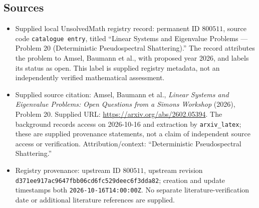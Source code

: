 \documentclass[11pt]{article}
\begin{document}
\subsection{Sources}
\begin{itemize}
\item Supplied local UnsolvedMath registry record: permanent ID \(800511\), source code \texttt{catalogue entry}, titled ``Linear Systems and Eigenvalue Problems --- Problem 20 (Deterministic Pseudospectral Shattering).'' The record attributes the problem to Amsel, Baumann et al., with proposed year 2026, and labels its status as open. This label is supplied registry metadata, not an independently verified mathematical assessment.
\item Supplied source citation: Amsel, Baumann et al., \emph{Linear Systems and Eigenvalue Problems: Open Questions from a Simons Workshop} (2026), Problem 20. Supplied URL: \url{https://arxiv.org/abs/2602.05394}. The background records access on 2026-10-16 and extraction by \texttt{arxiv\_latex}; these are supplied provenance statements, not a claim of independent source access or verification. Attribution/context: ``Deterministic Pseudospectral Shattering.''
\item Registry provenance: upstream ID \(800511\), upstream revision \texttt{d371ee917ac9647fbb06cd6fc529deec6f3dda82}; creation and update timestamps both \texttt{2026-10-16T14:00:00Z}. No separate literature-verification date or additional literature references are supplied.
\end{itemize}
\end{document}

